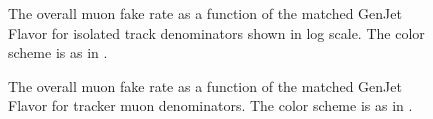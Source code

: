 \documentclass{cmspaper}
\begin{document}
\begin{figure}[htb]
\begin{center}
   \caption{The overall muon fake rate as a function of the matched GenJet Flavor for isolated track denominators shown in log scale. The color scheme is as in .}
   \label{fig:IsoTrackMuonFakeRate_JetFlavor}
\end{center}
\end{figure}

\clearpage

\begin{figure}[htb]
\begin{center}
   \caption{The overall muon fake rate as a function of the matched GenJet Flavor for tracker muon denominators. The color scheme is as in .}
   \label{fig:TrackerMuonFakeRate_JetFlavor}
\end{center}
\end{figure}
\end{document}
